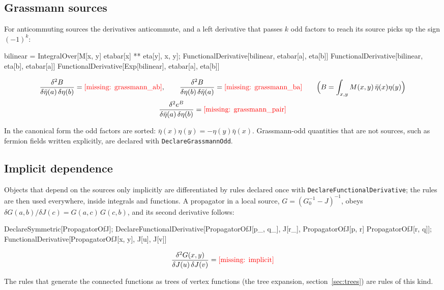 \documentclass[11pt,a4paper]{article}
\newcommand{\formula}[1]{\IfFileExists{figures/formula_#1.tex}{}{\text{\textcolor{red}{[missing: \detokenize{#1}]}}}}
\newcommand{\formulasplit}[1]{\IfFileExists{figures/formula_#1_split.tex}{}{\formula{#1}}}
\newcommand{\pkg}[1]{\texttt{#1}}
\begin{document}
\subsection{Grassmann sources}

For anticommuting sources the derivatives anticommute, and a left derivative that passes $k$ odd factors to reach its
source picks up the sign $(-1)^k$:
\begin{code}
bilinear = IntegralOver[M[x, y] etabar[x] ** eta[y], {x, y}];
FunctionalDerivative[bilinear, etabar[a], eta[b]]
FunctionalDerivative[bilinear, eta[b], etabar[a]]
FunctionalDerivative[Exp[bilinear], etabar[a], eta[b]]
\end{code}
\begin{outputbox}
\vspace{-6pt}
\begin{gather*}
\frac{\delta^2B}{\delta\bar\eta(a)\,\delta\eta(b)}=\formula{grassmann_ab},\qquad
\frac{\delta^2B}{\delta\eta(b)\,\delta\bar\eta(a)}=\formula{grassmann_ba}\qquad\Bigl(B=\int_{x,y}M(x,y)\,\bar\eta(x)\eta(y)\Bigr)\\[2pt]
\frac{\delta^2e^{B}}{\delta\bar\eta(a)\,\delta\eta(b)}=\formulasplit{grassmann_pair}
\end{gather*}
\end{outputbox}
In the canonical form the odd factors are sorted: $\bar\eta(x)\eta(y)=-\eta(y)\bar\eta(x)$. Grassmann-odd quantities that
are not sources, such as fermion fields written explicitly, are declared with \pkg{DeclareGrassmannOdd}.

\subsection{Implicit dependence}

Objects that depend on the sources only implicitly are differentiated by rules declared once with
\pkg{DeclareFunctionalDerivative}; the rules are then used everywhere, inside integrals and functions. A propagator in a
local source, $G=(G_0^{-1}-J)^{-1}$, obeys $\delta G(a,b)/\delta J(c)=G(a,c)\,G(c,b)$, and its second derivative follows:
\begin{code}
DeclareSymmetric[PropagatorOfJ];
DeclareFunctionalDerivative[PropagatorOfJ[p_, q_], J[r_],
    PropagatorOfJ[p, r] PropagatorOfJ[r, q]];
FunctionalDerivative[PropagatorOfJ[x, y], J[u], J[v]]
\end{code}
\begin{outputbox}
\vspace{-6pt}
\[
\frac{\delta^2 G(x,y)}{\delta J(u)\,\delta J(v)}=\formula{implicit}
\]
\end{outputbox}
The rules that generate the connected functions as trees of vertex functions (the tree expansion,
section~\ref{sec:trees}) are rules of this kind.
\end{document}
